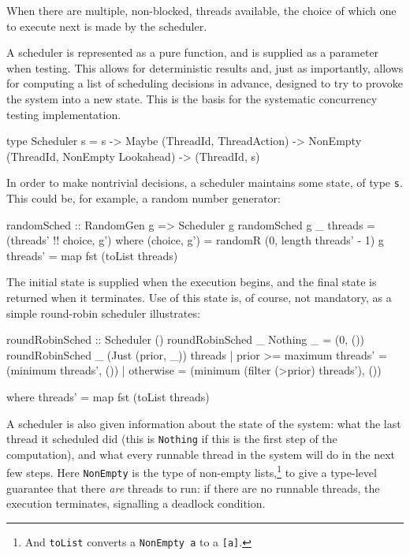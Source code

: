 When there are multiple, non-blocked, threads available, the choice of
which one to execute next is made by the scheduler.

A scheduler is represented as a pure function, and is supplied as a
parameter when testing. This allows for deterministic results and,
just as importantly, allows for computing a list of scheduling
decisions in advance, designed to try to provoke the system into a new
state. This is the basis for the systematic concurrency testing
implementation.

\begin{haskellcode}
type Scheduler s = s
  -> Maybe (ThreadId, ThreadAction)
  -> NonEmpty (ThreadId, NonEmpty Lookahead)
  -> (ThreadId, s)
\end{haskellcode}

In order to make nontrivial decisions, a scheduler maintains some
state, of type \verb|s|. This could be, for example, a random number
generator:

\begin{haskellcode}
randomSched :: RandomGen g => Scheduler g
randomSched g _ threads = (threads' !! choice, g') where
  (choice, g') = randomR (0, length threads' - 1) g
  threads'     = map fst (toList threads)
\end{haskellcode}

The initial state is supplied when the execution begins, and the final
state is returned when it terminates. Use of this state is, of course,
not mandatory, as a simple round-robin scheduler illustrates:

\begin{haskellcode}
roundRobinSched :: Scheduler ()
roundRobinSched _ Nothing _ = (0, ())
roundRobinSched _ (Just (prior, _)) threads
  | prior >= maximum threads' = (minimum threads', ())
  | otherwise = (minimum (filter (>prior) threads'), ())

  where threads' = map fst (toList threads)
\end{haskellcode}

A scheduler is also given information about the state of the system:
what the last thread it scheduled did (this is \verb|Nothing| if this
is the first step of the computation), and what every runnable thread
in the system will do in the next few steps. Here \verb|NonEmpty| is
the type of non-empty lists,\footnote{And \texttt{toList} converts a
  \texttt{NonEmpty a} to a \texttt{[a]}.} to give a type-level
guarantee that there \emph{are} threads to run: if there are no
runnable threads, the execution terminates, signalling a deadlock
condition.

